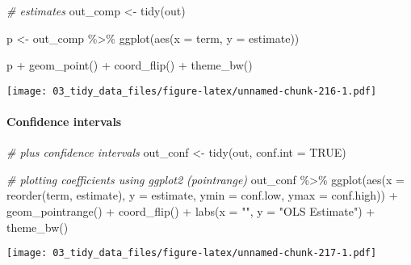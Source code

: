 \documentclass[
]{book}
\newenvironment{Shaded}{\begin{snugshade}}{\end{snugshade}}
\newcommand{\AttributeTok}[1]{\textcolor[rgb]{0.77,0.63,0.00}{#1}}
\newcommand{\CommentTok}[1]{\textcolor[rgb]{0.56,0.35,0.01}{\textit{#1}}}
\newcommand{\ConstantTok}[1]{\textcolor[rgb]{0.00,0.00,0.00}{#1}}
\newcommand{\FunctionTok}[1]{\textcolor[rgb]{0.00,0.00,0.00}{#1}}
\newcommand{\NormalTok}[1]{#1}
\newcommand{\OtherTok}[1]{\textcolor[rgb]{0.56,0.35,0.01}{#1}}
\newcommand{\SpecialCharTok}[1]{\textcolor[rgb]{0.00,0.00,0.00}{#1}}
\newcommand{\StringTok}[1]{\textcolor[rgb]{0.31,0.60,0.02}{#1}}
\begin{document}
\begin{Shaded}
\begin{Highlighting}[]
\CommentTok{\# estimates}
\NormalTok{out\_comp }\OtherTok{\textless{}{-}} \FunctionTok{tidy}\NormalTok{(out)}

\NormalTok{p }\OtherTok{\textless{}{-}}\NormalTok{ out\_comp }\SpecialCharTok{\%\textgreater{}\%}
  \FunctionTok{ggplot}\NormalTok{(}\FunctionTok{aes}\NormalTok{(}\AttributeTok{x =}\NormalTok{ term, }\AttributeTok{y =}\NormalTok{ estimate))}

\NormalTok{p }\SpecialCharTok{+} \FunctionTok{geom\_point}\NormalTok{() }\SpecialCharTok{+}
  \FunctionTok{coord\_flip}\NormalTok{() }\SpecialCharTok{+}
  \FunctionTok{theme\_bw}\NormalTok{()}
\end{Highlighting}
\end{Shaded}

\texttt{[image: 03\_tidy\_data\_files/figure-latex/unnamed-chunk-216-1.pdf]}

\hypertarget{confidence-intervals}{%
\paragraph{Confidence intervals}\label{confidence-intervals}}

\begin{Shaded}
\begin{Highlighting}[]
\CommentTok{\# plus confidence intervals}
\NormalTok{out\_conf }\OtherTok{\textless{}{-}} \FunctionTok{tidy}\NormalTok{(out, }\AttributeTok{conf.int =} \ConstantTok{TRUE}\NormalTok{)}

\CommentTok{\# plotting coefficients using ggplot2 (pointrange)}
\NormalTok{out\_conf }\SpecialCharTok{\%\textgreater{}\%}
  \FunctionTok{ggplot}\NormalTok{(}\FunctionTok{aes}\NormalTok{(}\AttributeTok{x =} \FunctionTok{reorder}\NormalTok{(term, estimate), }\AttributeTok{y =}\NormalTok{ estimate, }\AttributeTok{ymin =}\NormalTok{ conf.low, }\AttributeTok{ymax =}\NormalTok{ conf.high)) }\SpecialCharTok{+}
  \FunctionTok{geom\_pointrange}\NormalTok{() }\SpecialCharTok{+}
  \FunctionTok{coord\_flip}\NormalTok{() }\SpecialCharTok{+}
  \FunctionTok{labs}\NormalTok{(}\AttributeTok{x =} \StringTok{""}\NormalTok{, }\AttributeTok{y =} \StringTok{"OLS Estimate"}\NormalTok{) }\SpecialCharTok{+}
  \FunctionTok{theme\_bw}\NormalTok{()}
\end{Highlighting}
\end{Shaded}

\texttt{[image: 03\_tidy\_data\_files/figure-latex/unnamed-chunk-217-1.pdf]}
\end{document}
